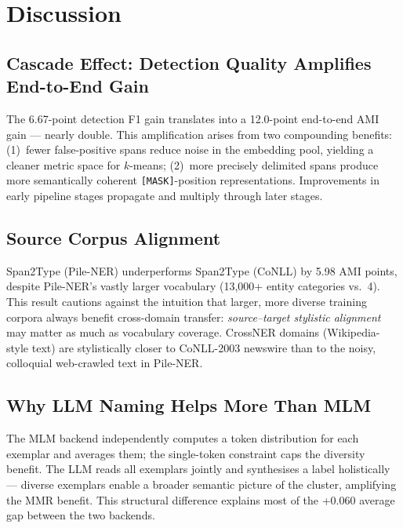 \documentclass[11pt,a4paper]{article}
\begin{document}
\section{Discussion}

\subsection{Cascade Effect: Detection Quality Amplifies End-to-End Gain}

The 6.67-point detection F1 gain translates into a 12.0-point end-to-end AMI gain — nearly double. This amplification arises from two compounding benefits: (1)~fewer false-positive spans reduce noise in the embedding pool, yielding a cleaner metric space for $k$-means; (2)~more precisely delimited spans produce more semantically coherent \texttt{[MASK]}-position representations. Improvements in early pipeline stages propagate and multiply through later stages.

\subsection{Source Corpus Alignment}

Span2Type (Pile-NER) underperforms Span2Type (CoNLL) by 5.98 AMI points, despite Pile-NER's vastly larger vocabulary (13,000+ entity categories vs.\ 4). This result cautions against the intuition that larger, more diverse training corpora always benefit cross-domain transfer: \emph{source–target stylistic alignment} may matter as much as vocabulary coverage. CrossNER domains (Wikipedia-style text) are stylistically closer to CoNLL-2003 newswire than to the noisy, colloquial web-crawled text in Pile-NER.

\subsection{Why LLM Naming Helps More Than MLM}

The MLM backend independently computes a token distribution for each exemplar and averages them; the single-token constraint caps the diversity benefit. The LLM reads all exemplars jointly and synthesises a label holistically — diverse exemplars enable a broader semantic picture of the cluster, amplifying the MMR benefit. This structural difference explains most of the +0.060 average gap between the two backends.
\end{document}
